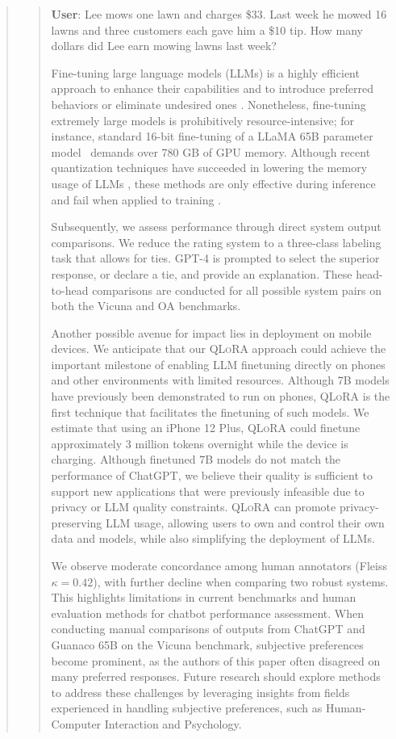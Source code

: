 \begin{quote}
\begin{quote}
    \textbf{User}: Lee mows one lawn and charges \$33. Last week he mowed 16 lawns and three customers each gave him a \$10 tip. How many dollars did Lee earn mowing lawns last week?

Fine-tuning large language models (LLMs) is a highly efficient approach to enhance their capabilities \citep{min2021metaicl, wei2021finetuned, ouyang2022training, wang2022super, wang2022self, liu2022few} and to introduce preferred behaviors or eliminate undesired ones \citep{ouyang2022training, askell2021general, bai2022training}. Nonetheless, fine-tuning extremely large models is prohibitively resource-intensive; for instance, standard 16-bit fine-tuning of a LLaMA 65B parameter model~\citep{touvron2023llama} demands over 780 GB of GPU memory. Although recent quantization techniques have succeeded in lowering the memory usage of LLMs \citep{dettmers2022llm, dettmers2022case, frantar2022gptq, xiao2022smoothquant}, these methods are only effective during inference and fail when applied to training \citep{wortsman2023stable}.

Subsequently, we assess performance through direct system output comparisons. We reduce the rating system to a three-class labeling task that allows for ties. GPT-4 is prompted to select the superior response, or declare a tie, and provide an explanation. These head-to-head comparisons are conducted for all possible system pairs on both the Vicuna and OA benchmarks.

Another possible avenue for impact lies in deployment on mobile devices. We anticipate that our \textsc{QLoRA} approach could achieve the important milestone of enabling LLM finetuning directly on phones and other environments with limited resources. Although 7B models have previously been demonstrated to run on phones, \textsc{QLoRA} is the first technique that facilitates the finetuning of such models. We estimate that using an iPhone 12 Plus, \textsc{QLoRA} could finetune approximately 3 million tokens overnight while the device is charging. Although finetuned 7B models do not match the performance of ChatGPT, we believe their quality is sufficient to support new applications that were previously infeasible due to privacy or LLM quality constraints. \textsc{QLoRA} can promote privacy-preserving LLM usage, allowing users to own and control their own data and models, while also simplifying the deployment of LLMs.

We observe moderate concordance among human annotators (Fleiss $\kappa=0.42$), with further decline when comparing two robust systems. This highlights limitations in current benchmarks and human evaluation methods for chatbot performance assessment. When conducting manual comparisons of outputs from ChatGPT and {Guanaco} 65B on the Vicuna benchmark, subjective preferences become prominent, as the authors of this paper often disagreed on many preferred responses. Future research should explore methods to address these challenges by leveraging insights from fields experienced in handling subjective preferences, such as Human-Computer Interaction and Psychology.


\end{quote}
\end{quote}
